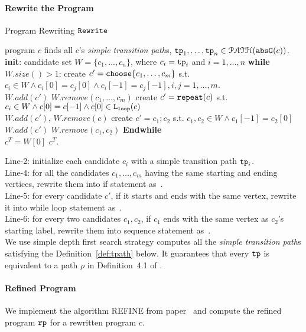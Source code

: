 \paragraph{Rewrite the Program}
\begin{algorithm}
  \caption{Program Rewriting $\mathtt{Rewrite}$}
  \label{alg:alg-refine_rewrite}
  \begin{algorithmic}[1]
    \REQUIRE program $c$
    \STATE finds all $c$'s \emph{simple transition path}s, $\mathtt{tp}_1, \ldots, \mathtt{tp}_n \in \mathcal{PATH}(\mathtt{abs}{\mathtt{G}}(c))$.
    \STATE \textbf{init}: candidate set $W = \{c_1, \ldots, c_n\}$, where $c_i = \mathtt{tp}_i$ and $i = 1, \ldots, n$
    \STATE \textbf{while} $W.size()> 1$:
    \STATE \quad create $c' = \rpchoose{c_1, \ldots, c_m}$ 
    s.t. $c_i \in W \land c_i[0] = c_j[0] \land c_i[-1] = c_j[-1], i, j = 1, \ldots, m$.
    \\ \quad $W.add(c')$ \qquad $W.remove(c_1, \ldots, c_m)$
    \STATE
    \quad create $c' = \mathtt{repeat}(c)$ s.t. $c_i \in W \land c[0] = c[-1] \land c[0] \in \mathtt{L}_{\mathtt{loop}}(c)$
    \\ \quad $W.add(c')$, \qquad $W.remove(c)$
    \STATE \quad create $c' = c_1; c_2$ s.t. $c_1, c_2 \in W \land c_1[-1] = c_2[0]$
    \\
    \quad $W.add(c')$ \qquad $W.remove(c_1, c_2)$
    \STATE \textbf{Endwhile}
    \\ $c^T = W[0]$
    \RETURN $c^T$.
\end{algorithmic}
\end{algorithm}
%
Line-2: initialize each candidate $c_i$ with a simple transition path $\mathtt{tp}_i$.
\\
Line-4: for all the candidates $c_1, \ldots, c_m$ having the same starting and ending vertices, rewrite them into if statement as~\cite{GulwaniJK09}.
\\
Line-5: for every candidate $c'$, if it starts and ends with the same vertex, rewrite it into while loop statement as~\cite{GulwaniJK09}.
\\
Line-6: for every two candidates $c_1, c_2$, if $c_1$ ends with the same vertex as $c_2$'s starting label, rewrite them into sequence statement as~\cite{GulwaniJK09}.
\\
We use simple depth first search strategy computes all the \emph{simple transition path}s satisfying the Definition~\ref{def:tpath} below.
It guarantees that  every $\mathtt{tp}$ is equivalent to a path $\rho$ in Definition~4.1 of \cite{GulwaniJK09}.

\paragraph{Refined Program}
We implement the algorithm REFINE from paper~\cite{GulwaniJK09} and compute the 
refined program $\mathtt{rp}$ for a rewritten program $c$.

